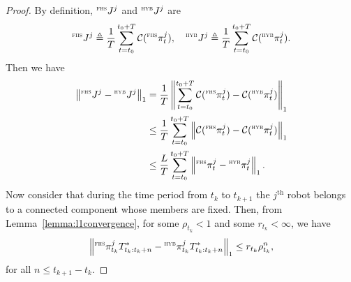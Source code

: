 \documentclass[journal]{IEEEtran}
\theoremstyle{remark}
\newcommand{\suf}[1]{\textsc{\tiny #1}}  %
\theoremstyle{definition}
\begin{document}
\begin{proof}
By definition, ${}^\suf{FHS}J^{j}$ and ${}^\suf{HYB}J^{j}$ are 
\begin{equation}
{}^\suf{FHS}J^{j} \triangleq  \frac{1}{T} \sum_{t=t_0}^{t_0+T} \mathcal{C}( {}^\suf{FHS}\pi_{t}^{j}), \quad  
{}^\suf{HYB}J^{j} \triangleq  \frac{1}{T} \sum_{t=t_0}^{t_0+T} \mathcal{C}( {}^\suf{HYB}\pi_{t}^{j}).
\end{equation}	
Then we have 
\begin{align}
\left\|{}^\suf{FHS}J^{j} - {}^\suf{HYB}J^{j} \right\|_1&=  \frac{1}{T}\left\|\sum_{t=t_0}^{t_0+T} \mathcal{C}( {}^\suf{FHS}\pi_{t}^{j}) - \mathcal{C}( {}^\suf{HYB}\pi_{t}^{j})\right\|_1 \\
&\le  \frac{1}{T}\sum_{t=t_0}^{t_0+T}\left\| \mathcal{C}( {}^\suf{FHS}\pi_{t}^{j}) - \mathcal{C}( {}^\suf{HYB}\pi_{t}^{j})\right\|_1\\
&\le  \frac{L}{T} \sum_{t=t_0}^{t_0+T}  \left\| {}^\suf{FHS}\pi_{t}^{j} - {}^\suf{HYB}\pi_{t}^{j}\right\|_1.
\end{align}
Now consider that during the time period from $t_{k}$ to $t_{k+1}$ the $j^{\text{th}}$ robot belongs to a connected component whose members are fixed. Then, from  Lemma~\ref{lemma:l1convergence},
for some 
$\rho_{t_k} < 1 $ and some $r_{t_k} < \infty$, we have
\begin{equation}
\left\| 
{}^\suf{FHS}\pi^j_{t_{k}} T^*_{t_{k}:t_{k}+n}  - {}^\suf{HYB}\pi^j_{t_{k}} T^*_{t_{k}:t_{k}+n} 
\right\|_1 \leq r_{t_k} \rho_{t_k} ^ n,
\end{equation}
for all $n \leq t_{k+1} - t_k$.


\end{proof}
\end{document}
